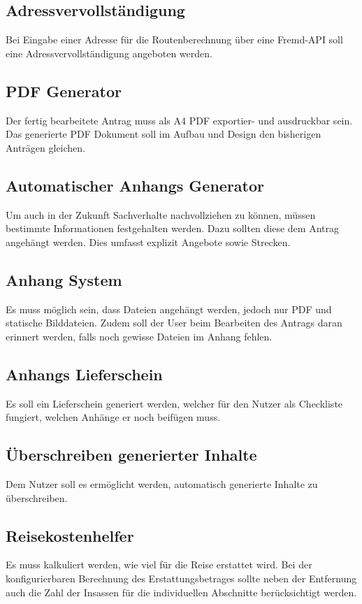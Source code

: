 \subsection{Adressvervollständigung}\label{subsec:adressvervollstandigung}
Bei Eingabe einer Adresse für die Routenberechnung über eine Fremd-\ac{API} soll eine Adressvervollständigung angeboten werden.
\subsection{\ac{PDF} Generator}\label{subsec:pdf-generator}
Der fertig bearbeitete Antrag muss als A4 \ac{PDF} exportier- und ausdruckbar sein.
Das generierte \ac{PDF} Dokument soll im Aufbau und Design den bisherigen Anträgen gleichen.
\subsection{Automatischer Anhangs Generator}\label{subsec:automatischer-anhangs-generator}
Um auch in der Zukunft Sachverhalte nachvollziehen zu können, müssen bestimmte Informationen festgehalten werden.
Dazu sollten diese dem Antrag angehängt werden.
Dies umfasst explizit Angebote sowie Strecken.
\subsection{Anhang System}\label{subsec:anhang-system}
Es muss möglich sein, dass Dateien angehängt werden, jedoch nur \ac{PDF} und statische Bilddateien.
Zudem soll der User beim Bearbeiten des Antrags daran erinnert werden, falls noch gewisse Dateien im Anhang fehlen.
\subsection{Anhangs Lieferschein}\label{subsec:anhangs-lieferschein}
Es soll ein Lieferschein generiert werden, welcher für den Nutzer als Checkliste fungiert, welchen Anhänge er noch beifügen muss.
\subsection{Überschreiben generierter Inhalte}\label{subsec:uberschreiben-generierter-inhalte}
Dem Nutzer soll es ermöglicht werden, automatisch generierte Inhalte zu überschreiben.
\subsection{Reisekostenhelfer}\label{subsec:reisekosten-helper}
Es muss kalkuliert werden, wie viel für die Reise erstattet wird.
Bei der konfigurierbaren Berechnung des Erstattungsbetrages sollte neben der Entfernung auch die Zahl der Insassen für
die individuellen Abschnitte berücksichtigt werden.

